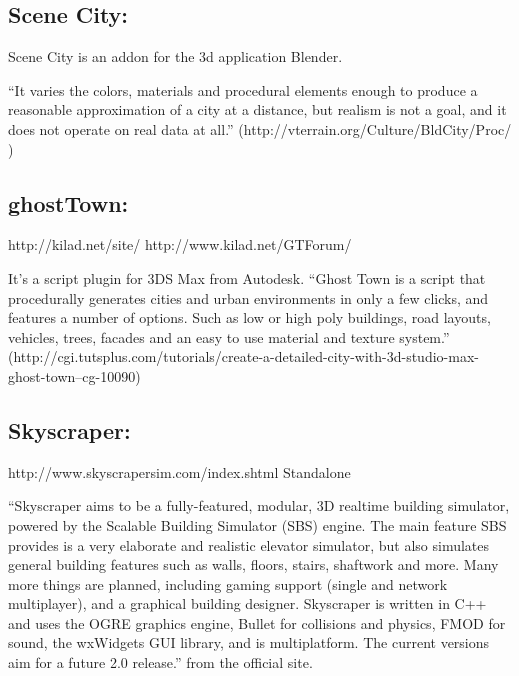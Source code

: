 
\subsection{Scene City:} %
\label{sub:Scene City}

\cite{SceneCity2014}


Scene City is an addon for the 3d application Blender.


“It varies the colors, materials and procedural elements enough to produce a reasonable approximation of a city at a distance, but realism is not a goal, and it does not operate on real data at all.” (http://vterrain.org/Culture/BldCity/Proc/ )


\subsection{ghostTown:} %
\label{sub:ghosttown}

http://kilad.net/site/
http://www.kilad.net/GTForum/


It’s a script plugin for 3DS Max from Autodesk.
“Ghost Town is a script that procedurally generates cities and urban environments in only a few clicks, and features a number of options. Such as low or high poly buildings, road layouts, vehicles, trees, facades and an easy to use material and texture system.” (http://cgi.tutsplus.com/tutorials/create-a-detailed-city-with-3d-studio-max-ghost-town--cg-10090)


\subsection{Skyscraper:} %
\label{sub:skyscraper}

http://www.skyscrapersim.com/index.shtml
Standalone


“Skyscraper aims to be a fully-featured, modular, 3D realtime building simulator, powered by the Scalable Building Simulator (SBS) engine. The main feature SBS provides is a very elaborate and realistic elevator simulator, but also simulates general building features such as walls, floors, stairs, shaftwork and more. Many more things are planned, including gaming support (single and network multiplayer), and a graphical building designer. Skyscraper is written in C++ and uses the OGRE graphics engine, Bullet for collisions and physics, FMOD for sound, the wxWidgets GUI library, and is multiplatform. The current versions aim for a future 2.0 release.” from the official site.

